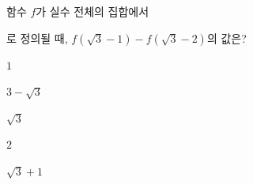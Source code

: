 \hspace*{2mm}\begin{minipage}[t]{\dimexpr\linewidth-2mm\relax}\vspace{0pt}
함수 $f$가 실수 전체의 집합에서\par\smallskip{}\par\smallskip\noindent 로 정의될 때, $f(\sqrt{3}-1)-f(\sqrt{3}-2)$의 값은?
\begin{choices32}{\rule[-3ex]{0pt}{8ex}$1$}{\rule[-3ex]{0pt}{8ex}$3-\sqrt{3}$}{\rule[-3ex]{0pt}{8ex}$\sqrt{3}$}{\rule[-3ex]{0pt}{8ex}$2$}{\rule[-3ex]{0pt}{8ex}$\sqrt{3}+1$}\end{choices32}\end{minipage}
